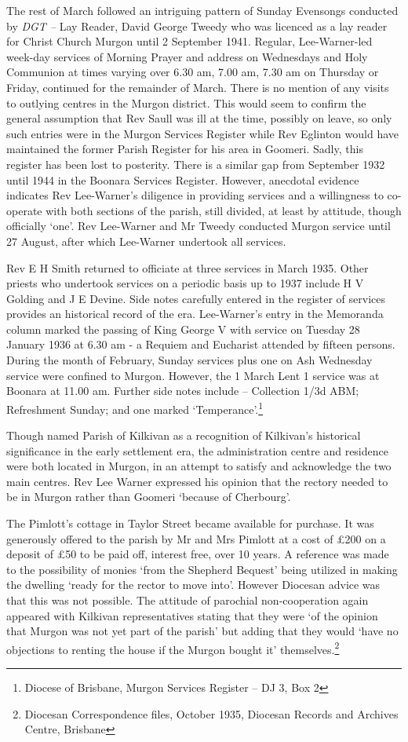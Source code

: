 The rest of March followed an intriguing pattern of Sunday Evensongs conducted by \emph{DGT --} Lay Reader, David George Tweedy who was licenced as a lay reader for Christ Church Murgon until 2 September 1941. Regular, Lee-Warner-led week-day services of Morning Prayer and address on Wednesdays and Holy Communion at times varying over 6.30 am, 7.00 am, 7.30 am on Thursday or Friday, continued for the remainder of March. There is no mention of any visits to outlying centres in the Murgon district. This would seem to confirm the general assumption that Rev Saull was ill at the time, possibly on leave, so only such entries were in the Murgon Services Register while Rev Eglinton would have maintained the former Parish Register for his area in Goomeri. Sadly, this register has been lost to posterity. There is a similar gap from September 1932 until 1944 in the Boonara Services Register. However, anecdotal evidence indicates Rev Lee-Warner's diligence in providing services and a willingness to co-operate with both sections of the parish, still divided, at least by attitude, though officially `one'. Rev Lee-Warner and Mr Tweedy conducted Murgon service until 27 August, after which Lee-Warner undertook all services.

Rev E H Smith returned to officiate at three services in March 1935. Other priests who undertook services on a periodic basis up to 1937 include H V Golding and J E Devine. Side notes carefully entered in the register of services provides an historical record of the era. Lee-Warner's entry in the Memoranda column marked the passing of King George V with service on Tuesday 28 January 1936 at 6.30 am - a Requiem and Eucharist attended by fifteen persons. During the month of February, Sunday services plus one on Ash Wednesday service were confined to Murgon. However, the 1 March Lent 1 service was at Boonara at 11.00 am. Further side notes include -- Collection 1/3d ABM; Refreshment Sunday; and one marked `Temperance'.\footnote{Diocese of Brisbane, Murgon Services Register -- DJ 3, Box 2}

Though named Parish of Kilkivan as a recognition of Kilkivan's historical significance in the early settlement era, the administration centre and residence were both located in Murgon, in an attempt to satisfy and acknowledge the two main centres. Rev Lee Warner expressed his opinion that the rectory needed to be in Murgon rather than Goomeri `because of Cherbourg'.

The Pimlott's cottage in Taylor Street became available for purchase. It was generously offered to the parish by Mr and Mrs Pimlott at a cost of £200 on a deposit of £50 to be paid off, interest free, over 10 years. A reference was made to the possibility of monies `from the Shepherd Bequest' being utilized in making the dwelling `ready for the rector to move into'. However Diocesan advice was that this was not possible. The attitude of parochial non-cooperation again appeared with Kilkivan representatives stating that they were `of the opinion that Murgon was not yet part of the parish' but adding that they would `have no objections to renting the house if the Murgon bought it' themselves.\footnote{Diocesan Correspondence files, October 1935, Diocesan Records and Archives Centre, Brisbane}

